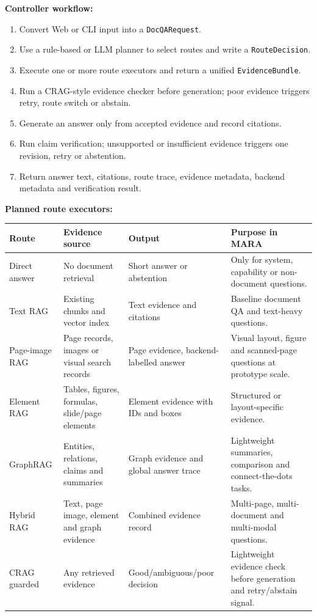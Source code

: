 \documentclass{article}
\begin{document}
\textbf{Controller workflow:}
\begin{enumerate}
  \item Convert Web or CLI input into a \texttt{DocQARequest}.
  \item Use a rule-based or LLM planner to select routes and write a \texttt{RouteDecision}.
  \item Execute one or more route executors and return a unified \texttt{EvidenceBundle}.
  \item Run a CRAG-style evidence checker before generation; poor evidence triggers retry, route switch or abstain.
  \item Generate an answer only from accepted evidence and record citations.
  \item Run claim verification; unsupported or insufficient evidence triggers one revision, retry or abstention.
  \item Return answer text, citations, route trace, evidence metadata, backend metadata and verification result.
\end{enumerate}

\textbf{Planned route executors:}
\begin{center}
\scriptsize
\begin{tabularx}{\textwidth}{p{}p{}p{}X}
\toprule
Route & Evidence source & Output & Purpose in MARA \\
\midrule
Direct answer & No document retrieval & Short answer or abstention & Only for system, capability or non-document questions. \\
Text RAG & Existing chunks and vector index & Text evidence and citations & Baseline document QA and text-heavy questions. \\
Page-image RAG & Page records, images or visual search records & Page evidence, backend-labelled answer & Visual layout, figure and scanned-page questions at prototype scale. \\
Element RAG & Tables, figures, formulas, slide/page elements & Element evidence with IDs and boxes & Structured or layout-specific evidence. \\
GraphRAG & Entities, relations, claims and summaries & Graph evidence and global answer trace & Lightweight summaries, comparison and connect-the-dots tasks. \\
Hybrid RAG & Text, page image, element and graph evidence & Combined evidence record & Multi-page, multi-document and multi-modal questions. \\
CRAG guarded & Any retrieved evidence & Good/ambiguous/poor decision & Lightweight evidence check before generation and retry/abstain signal. \\
\bottomrule
\end{tabularx}
\end{center}
\end{document}
